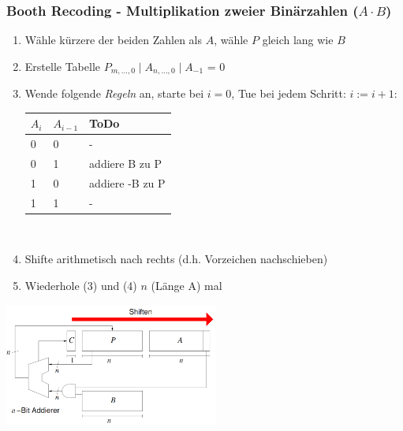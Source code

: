 	\subsubsection{Booth Recoding - Multiplikation zweier Binärzahlen ($A \cdot B$)}
	\begin{multicols}{2}
		
			\begin{enumerate}
				\item Wähle kürzere der beiden Zahlen als $A$, wähle $P$ gleich lang wie $B$\\[-5mm]
				\item Erstelle Tabelle $P_{m, \ldots, 0} \mid A_{n, \ldots, 0} \mid A_{-1}$ = 0\\[-5mm]
				\item Wende folgende \emph{Regeln} an, starte bei $i = 0$, Tue bei jedem Schritt: $i := i + 1$:\\[1.5mm]
					\begin{tabular}{l | l | l}
						$A_i$   &   $A_{i-1}$   &   ToDo\\\hline\hline
						0       &   0           &   - \\\hline
						0       &   1           &   addiere B zu P\\\hline
						1       &   0           &   addiere -B zu P\\\hline
						1       &   1           &   -
					\end{tabular}
					\\[-2mm]
				\item Shifte arithmetisch nach rechts (d.h. Vorzeichen nachschieben)\\[-5.5mm]
				\item Wiederhole (3) und (4) $n$ (Länge A) mal\\[-5.5mm]
			\end{enumerate}
			
		\columnbreak
		
			\begin{center}
			\includegraphics[width = 7cm]{images/arith/mult.png}
			\end{center}
	\end{multicols}

		
		
		
		
		
		
		
		
		
		
		
		
		
		
		
		
		
		
		
		
		
		
		